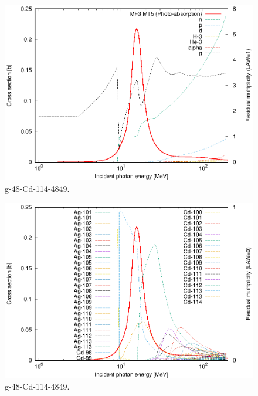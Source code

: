 \begin{figure}
 \includegraphics[width=\linewidth]{eps/g_48-Cd-114_4849.eps}
  \caption{g-48-Cd-114-4849.}
\end{figure}
\begin{figure}
 \includegraphics[width=\linewidth]{eps-law0/g_48-Cd-114_4849.eps}
 \caption{g-48-Cd-114-4849.}
\end{figure}
\newpage \clearpage

